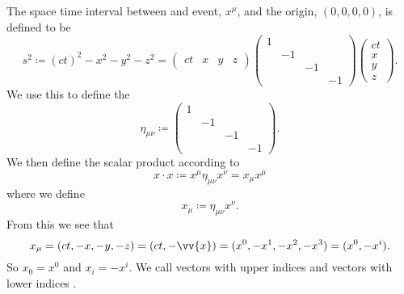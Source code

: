 The space time interval between and event, \(x^\mu\), and the origin, \((0, 0, 0, 0)\), is defined to be
\begin{equation}
    s^2 \coloneqq (ct)^2 - x^2 - y^2 - z^2 = 
    \begin{pmatrix}
        ct & x & y & z
    \end{pmatrix}
    \begin{pmatrix}
        1 & & & \\
        & -1 & & \\
        & & -1 & \\
        & & & -1
    \end{pmatrix}
    \begin{pmatrix}
        ct\\ x\\ y\\ z
    \end{pmatrix}
    .
\end{equation}
We use this to define the 
\begin{equation}
    \eta_{\mu\nu} \coloneqq 
    \begin{pmatrix}
        1 & & & \\
        & -1 & & \\
        & & -1 & \\
        & & & -1
    \end{pmatrix}
    .
\end{equation}
We then define the scalar product according to
\begin{equation}
    x\cdot x \coloneqq x^\mu\eta_{\mu\nu}x^\nu = x_\mu x^\mu
\end{equation}
where we define
\begin{equation}
    x_\mu \coloneqq \eta_{\mu\nu}x^\nu.
\end{equation}
From this we see that
\begin{equation}
    x_\mu = (ct, -x, -y, -z) = (ct, -\vv{x}) = (x^0, -x^1, -x^2, -x^3) = (x^0, -x^i).
\end{equation}
So \(x_0 = x^0\) and \(x_i = -x^i\).
We call vectors with upper indices  and vectors with lower indices .

